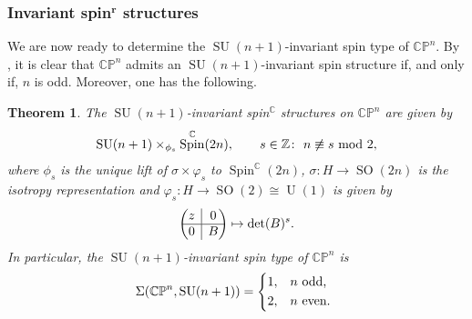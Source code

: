 \documentclass[pdftex]{sigma}
\numberwithin{equation}{section}
\newtheorem{Theorem}{Theorem}[section]
\newcommand{\rvline}{\hspace*{-\arraycolsep}\vline\hspace*{-\arraycolsep}}
\DeclareMathOperator{\SO}{SO}
\DeclareMathOperator{\Spin}{Spin}
\DeclareMathOperator{\SU}{SU}
\DeclareMathOperator{\U}{U}
\begin{document}
		
		\subsubsection[Invariant spin\^{}r structures]{Invariant spin$^{\boldsymbol{r}}$ structures}
		
		We are now ready to determine the $\SU(n+1)$-invariant spin type of $\mathbb{CP}^{n}$. By \cite[p.~327]{HS90}, it is clear that $\mathbb{CP}^{n}$ admits an $\SU(n+1)$-invariant spin structure if, and only if, $n$ is odd. Moreover, one has the following.

		\begin{Theorem}\label{thm:her_cpn_str}
			The $\SU(n+1)$-invariant spin$^{\mathbb{C}}$ structures on $\mathbb{CP}^n$ are given by
			\begin{equation*}
				\SU(n+1) \times_{\phi_s} \Spin^{\mathbb{C}}(2n) , \qquad s \in \mathbb{Z} \colon\ n \not\equiv s \text{ \rm mod } 2 ,
			\end{equation*}
			where $\phi_s$ is the unique lift of $\sigma \times \varphi_s$ to $\Spin^{\mathbb{C}}(2n)$, $\sigma \colon H \to \SO(2n)$ is the isotropy representation and $\varphi_s \colon H \to \SO(2) \cong \U(1)$ is given by
\[
\begin{pmatrix}
				z
				& \rvline & 0 \\
				\hline
				0 & \rvline &
				B
			\end{pmatrix} \mapsto \det(B)^s.
\]
 In particular, the $\SU(n+1)$-invariant spin type of $\mathbb{CP}^{n}$ is
			\begin{equation*}
				\Sigma(\mathbb{CP}^n,\SU(n+1)) =
				\begin{dcases}
					1, & n \text{ odd, }\\
					2, & n \text{ even. }
				\end{dcases}
			\end{equation*}
		\end{Theorem}
\end{document}
